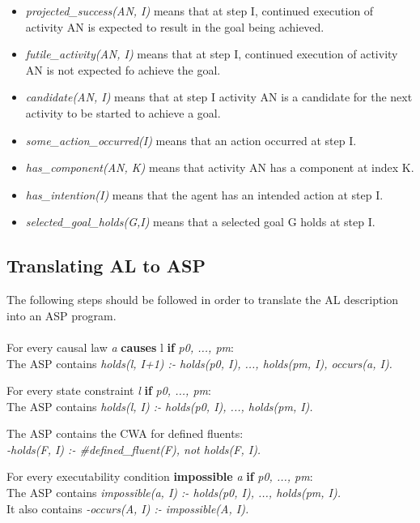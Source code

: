 \documentclass[11pt, oneside]{article}
\begin{document}
\begin{itemize}
\item \textit{projected\_success(AN, I)} means that at step I, continued execution of activity AN is expected to result in the goal being achieved.
\item \textit{futile\_activity(AN, I)} means that at step I, continued execution of activity AN is not expected fo achieve the goal.
\item \textit{candidate(AN, I)} means that at step I activity AN is a candidate for the next activity to be started to achieve a goal.
\item \textit{some\_action\_occurred(I)} means that an action occurred at step I.
\item \textit{has\_component(AN, K)} means that activity AN has a component at index K.
\item \textit{has\_intention(I)} means that the agent has an intended action at step I.
\item \textit{selected\_goal\_holds(G,I)} means that a selected goal G holds at step I.
\end{itemize}



\subsection{Translating AL to ASP}
The following steps should be followed in order to translate the AL description into an ASP program.\\
\\
For every causal law \textit{a} \textbf{causes} l \textbf{if} \textit{p0, ..., pm}:\\
The ASP contains \textit{holds(l, I+1) :- holds(p0, I), ..., holds(pm, I), occurs(a, I).}\par

For every state constraint \textit{l} \textbf{if} \textit{p0, ..., pm}:\\
The ASP contains \textit{holds(l, I) :- holds(p0, I), ..., holds(pm, I).}\par

The ASP contains the CWA for defined fluents:\\
\textit{-holds(F, I) :- \#defined\_fluent(F), not holds(F, I).}\par

For every executability condition \textbf{impossible} \textit{a} \textbf{if} \textit{p0, ..., pm}:\\
The ASP contains \textit{impossible(a, I) :- holds(p0, I), ..., holds(pm, I).}\\
It also contains \textit{-occurs(A, I) :- impossible(A, I).}\par
\end{document}

